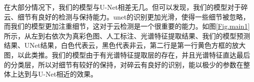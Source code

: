 \documentclass[UTF8]{ctexart}
\begin{document}
在大部分情况下，我们的模型与U-Net相差无几。但可以发现，我们的模型对于碎云、细节有良好的检测与保持能力。unet的识别更加光滑，使得一些细节被忽略，而我们的模型更加注重细节，这对于云检测是一个很重要的能力。如图\ref{Fig.main1}所示，从左到右依次为真彩色图、人工标注、光谱特征提取结果、我们的模型预测结果、UNet结果，白色代表云，黑色代表非云，第二行是第一行黄色方框的放大图，以此类推。我们的模型由于有光谱特征提取层的存在，并且光谱特征直达最后的分类层，所以对细节有较好的保持，对碎云有良好的识别，能以极少的参数在整体上达到与U-Net相近的效果。

\begin{figure}[H]
    \centering
\end{figure}
\end{document}
